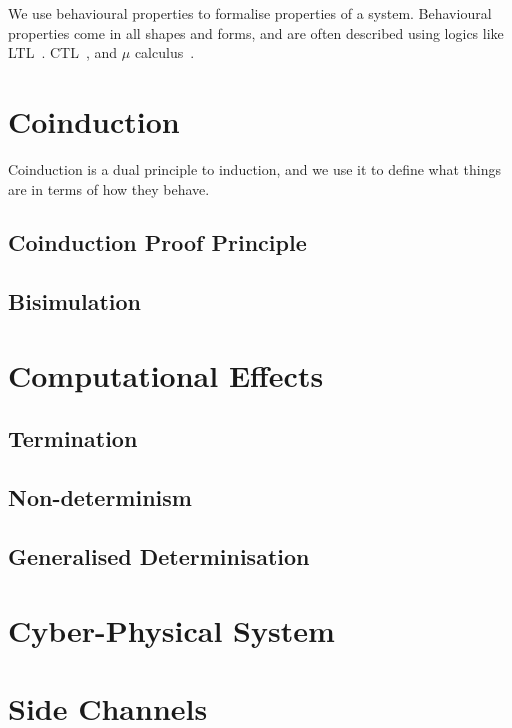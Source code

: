 We use {behavioural properties} to formalise properties of a system. Behavioural properties come in all shapes and forms, and are often described using logics like LTL~\cite{LTL}. CTL~\cite{CTL}, and $\mu$ calculus~\cite{MuCalculus}.

\section{Coinduction}
Coinduction is a dual principle to induction, and we use it to define what things are in terms of how they behave. 

\subsection{Coinduction Proof Principle}
\subsection{Bisimulation}

\section{Computational Effects}
\subsection{Termination}
\subsection{Non-determinism}
\subsection{Generalised Determinisation}

\section{Cyber-Physical System} 
\section{Side Channels}